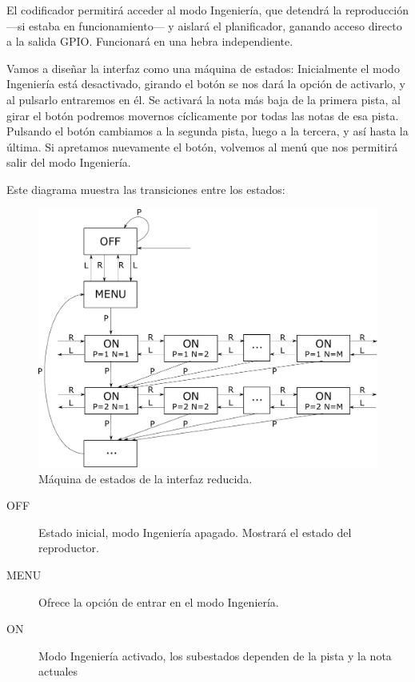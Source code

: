 El codificador permitirá acceder al modo Ingeniería, que detendrá la reproducción ---si estaba en funcionamiento--- y  aislará el planificador, ganando acceso directo a la salida \acrshort{GPIO}. Funcionará en una hebra independiente.

Vamos a diseñar la interfaz como una máquina de estados: Inicialmente el modo Ingeniería está desactivado, girando el botón se nos dará la opción de activarlo, y al pulsarlo entraremos en él. Se activará la nota más baja de la primera pista, al girar el botón podremos movernos cíclicamente por todas las notas de esa pista. Pulsando el botón cambiamos a la segunda pista, luego a la tercera, y así hasta la última. Si apretamos nuevamente el botón, volvemos al menú que nos permitirá salir del modo Ingeniería.

Este diagrama muestra las transiciones entre los estados:

\smallskip

\begin{figure}[H]
	\noindent \begin{centering}
		\includegraphics[width=\linewidth*3/4]{capitulo4/engineer}
		\par\end{centering}
	\smallskip
	\caption{\label{fig:engineer} Máquina de estados de la interfaz reducida.}
\end{figure} 

\smallskip

\begin{description}
	\item[OFF] Estado inicial, modo Ingeniería apagado. Mostrará el estado del reproductor.
	\item[MENU] Ofrece la opción de entrar en el modo Ingeniería.
	\item[ON] Modo Ingeniería activado, los subestados dependen de la pista y la nota actuales
\end{description}

